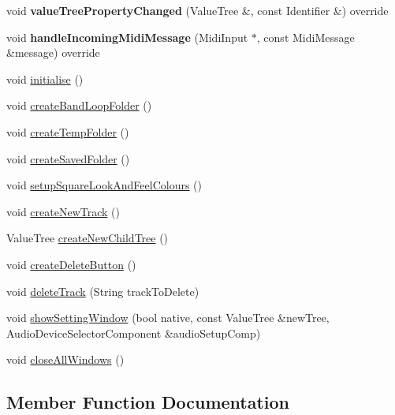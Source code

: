 \begin{DoxyCompactItemize}
void {\bfseries value\+Tree\+Property\+Changed} (Value\+Tree \&, const Identifier \&) override
\item 
\mbox{\label{class_main_component_a32bc00f32ee1aaaa8415c40d6b58a393}} 
void {\bfseries handle\+Incoming\+Midi\+Message} (Midi\+Input $\ast$, const Midi\+Message \&message) override
\item 
void \mbox{\hyperlink{class_main_component_ad616083023bd51de9fd23702039dc10f}{initialise}} ()
\item 
void \mbox{\hyperlink{class_main_component_a0a21d29760452df310f4ae5b15290818}{create\+Band\+Loop\+Folder}} ()
\item 
void \mbox{\hyperlink{class_main_component_ab9345f49a82ce81b98cd552e88b0ee08}{create\+Temp\+Folder}} ()
\item 
void \mbox{\hyperlink{class_main_component_af9933860cbfc7c14fb4403e732e1f2c1}{create\+Saved\+Folder}} ()
\item 
void \mbox{\hyperlink{class_main_component_a6fa14be18558d997ff7eeccc8d85e4f4}{setup\+Square\+Look\+And\+Feel\+Colours}} ()
\item 
void \mbox{\hyperlink{class_main_component_a37ad1936a014ef9402641eb9a6a0cecf}{create\+New\+Track}} ()
\item 
Value\+Tree \mbox{\hyperlink{class_main_component_aabdd825c15b28c53ce5b506223293e39}{create\+New\+Child\+Tree}} ()
\item 
void \mbox{\hyperlink{class_main_component_a6932ee4943e32ec7c180c4ae95866794}{create\+Delete\+Button}} ()
\item 
void \mbox{\hyperlink{class_main_component_a6e63d5b027c5b9b9bdd81378e0d9c55e}{delete\+Track}} (String track\+To\+Delete)
\item 
void \mbox{\hyperlink{class_main_component_a8b2111fded9a8ff483c53c86c1827785}{show\+Setting\+Window}} (bool native, const Value\+Tree \&new\+Tree, Audio\+Device\+Selector\+Component \&audio\+Setup\+Comp)
\item 
void \mbox{\hyperlink{class_main_component_a4e6cc68f274c8f0aef85e089af9ccc8f}{close\+All\+Windows}} ()
\end{DoxyCompactItemize}


\subsection{Member Function Documentation}
\mbox{\label{class_main_component_a3ce1d04f8a20bcc54454e5e94017c5ff}} 
